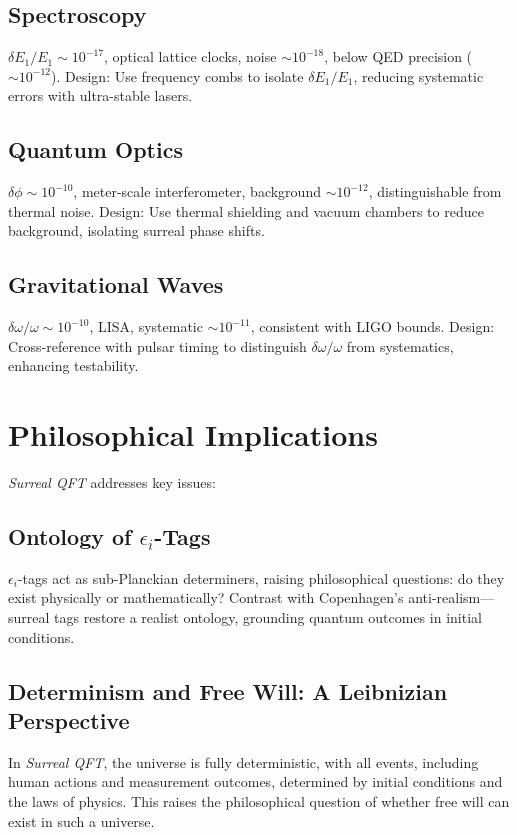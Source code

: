 \documentclass{article}
\begin{document}
\subsection{Spectroscopy}
\(\delta E_1 / E_1 \sim 10^{-17}\), optical lattice clocks, noise \(\sim 10^{-18}\), below QED precision (\(\sim 10^{-12}\)). Design: Use frequency combs to isolate \(\delta E_1 / E_1\), reducing systematic errors with ultra-stable lasers.

\subsection{Quantum Optics}
\(\delta \phi \sim 10^{-10}\), meter-scale interferometer, background \(\sim 10^{-12}\), distinguishable from thermal noise. Design: Use thermal shielding and vacuum chambers to reduce background, isolating surreal phase shifts.

\subsection{Gravitational Waves}
\(\delta \omega / \omega \sim 10^{-10}\), LISA, systematic \(\sim 10^{-11}\), consistent with LIGO bounds. Design: Cross-reference with pulsar timing to distinguish \(\delta \omega / \omega\) from systematics, enhancing testability.

\section{Philosophical Implications}
\textit{Surreal QFT} addresses key issues:
\subsection{Ontology of \texorpdfstring{$\epsilon_i$}{ε_i}-Tags}
\(\epsilon_i\)-tags act as sub-Planckian determiners, raising philosophical questions: do they exist physically or mathematically? Contrast with Copenhagen's anti-realism---surreal tags restore a realist ontology, grounding quantum outcomes in initial conditions.

\subsection{Determinism and Free Will: A Leibnizian Perspective}
In \textit{Surreal QFT}, the universe is fully deterministic, with all events, including human actions and measurement outcomes, determined by initial conditions and the laws of physics. This raises the philosophical question of whether free will can exist in such a universe.
\end{document}
